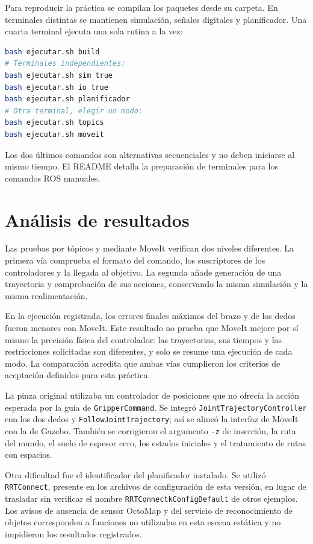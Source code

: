 \documentclass[conference]{IEEEtran}
\begin{document}
Para reproducir la práctica se compilan los paquetes desde su carpeta.
En terminales distintas se mantienen simulación, señales digitales
y planificador. Una cuarta terminal ejecuta una sola rutina a la vez:
\begin{lstlisting}[language=bash,caption={Arranque, con un proceso por terminal.}]
bash ejecutar.sh build
# Terminales independientes:
bash ejecutar.sh sim true
bash ejecutar.sh io true
bash ejecutar.sh planificador
# Otra terminal, elegir un modo:
bash ejecutar.sh topics
bash ejecutar.sh moveit
\end{lstlisting}
Los dos últimos comandos son alternativas secuenciales y no deben
iniciarse al mismo tiempo. El README detalla la preparación de
terminales para los comandos ROS manuales.

\section{Análisis de resultados}
Las pruebas por tópicos y mediante MoveIt verifican dos niveles
diferentes. La primera vía comprueba el formato del comando, los
suscriptores de los controladores y la llegada al objetivo. La segunda
añade generación de una trayectoria y comprobación de sus acciones,
conservando la misma simulación y la misma realimentación.

En la ejecución registrada, los errores finales máximos del brazo
y de los dedos fueron menores con MoveIt. Este resultado no prueba
que MoveIt mejore por sí mismo la precisión física del controlador:
las trayectorias, sus tiempos y las restricciones solicitadas son
diferentes, y solo se resume una ejecución de cada modo.
La comparación acredita que ambas vías cumplieron los criterios
de aceptación definidos para esta práctica.

La pinza original utilizaba un controlador de posiciones que no
ofrecía la acción esperada por la guía de \texttt{GripperCommand}.
Se integró \texttt{JointTrajectoryController} con los dos dedos
y \texttt{FollowJointTrajectory}; así se alineó la interfaz de
MoveIt con la de Gazebo. También se corrigieron el argumento
\texttt{-z} de inserción, la ruta del mundo, el suelo de espesor
cero, los estados iniciales y el tratamiento de rutas con espacios.

Otra dificultad fue el identificador del planificador instalado.
Se utilizó \texttt{RRTConnect}, presente en los archivos de
configuración de esta versión, en lugar de trasladar sin verificar
el nombre \texttt{RRTConnectkConfigDefault} de otros ejemplos.
Los avisos de ausencia de sensor OctoMap y del servicio de
reconocimiento de objetos corresponden a funciones no utilizadas
en esta escena estática y no impidieron los resultados registrados.
\end{document}
